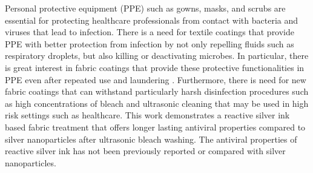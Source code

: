 \documentclass[10pt,letterpaper]{article}
\begin{document}
Personal protective equipment (PPE) such as  gowns,  masks, and scrubs are essential for protecting healthcare professionals from contact with bacteria and viruses that lead to infection.
There is a need for textile coatings that provide PPE with better protection from infection 
by not only repelling fluids such as 
respiratory droplets, but 
also killing or deactivating microbes.\cite{iyigundogdu:2017} In particular, there is great interest in fabric coatings that provide these protective functionalities in PPE even after repeated use and laundering \cite{Kraay:18,galante:2020,galante:2022}.
Furthermore, there is need for new fabric coatings that can withstand particularly harsh disinfection procedures such as high concentrations of bleach and ultrasonic cleaning that may be used in high %
risk settings such as healthcare. This work demonstrates a reactive silver ink based fabric treatment that offers longer lasting antiviral properties compared to silver nanoparticles after ultrasonic bleach washing. The antiviral properties of reactive silver ink has not been previously reported or compared with silver nanoparticles.


\end{document}

